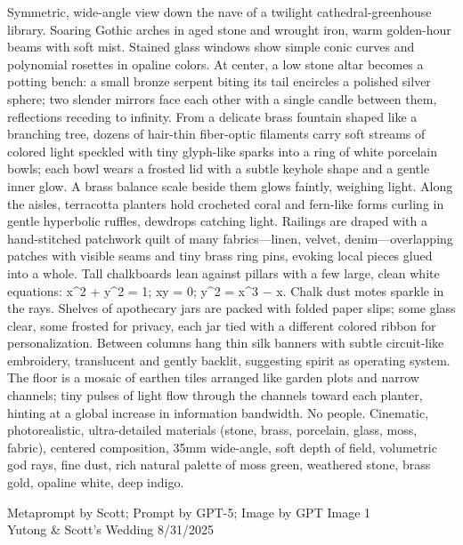 \documentclass[12pt]{article}
\begin{document}
\noindent
\begin{adjustbox}{max size={\textwidth}{\textheight}}
\begin{varwidth}{\textwidth}
\RaggedRight
\footnotesize
Symmetric, wide-angle view down the nave of a twilight cathedral-greenhouse library. Soaring Gothic arches in aged stone and wrought iron, warm golden-hour beams with soft mist. Stained glass windows show simple conic curves and polynomial rosettes in opaline colors. At center, a low stone altar becomes a potting bench: a small bronze serpent biting its tail encircles a polished silver sphere; two slender mirrors face each other with a single candle between them, reflections receding to infinity. From a delicate brass fountain shaped like a branching tree, dozens of hair-thin fiber-optic filaments carry soft streams of colored light speckled with tiny glyph-like sparks into a ring of white porcelain bowls; each bowl wears a frosted lid with a subtle keyhole shape and a gentle inner glow. A brass balance scale beside them glows faintly, weighing light. Along the aisles, terracotta planters hold crocheted coral and fern-like forms curling in gentle hyperbolic ruffles, dewdrops catching light. Railings are draped with a hand-stitched patchwork quilt of many fabrics—linen, velvet, denim—overlapping patches with visible seams and tiny brass ring pins, evoking local pieces glued into a whole. Tall chalkboards lean against pillars with a few large, clean white equations: x\textasciicircum{}2 + y\textasciicircum{}2 = 1; xy = 0; y\textasciicircum{}2 = x\textasciicircum{}3 − x. Chalk dust motes sparkle in the rays. Shelves of apothecary jars are packed with folded paper slips; some glass clear, some frosted for privacy, each jar tied with a different colored ribbon for personalization. Between columns hang thin silk banners with subtle circuit-like embroidery, translucent and gently backlit, suggesting spirit as operating system. The floor is a mosaic of earthen tiles arranged like garden plots and narrow channels; tiny pulses of light flow through the channels toward each planter, hinting at a global increase in information bandwidth. No people. Cinematic, photorealistic, ultra-detailed materials (stone, brass, porcelain, glass, moss, fabric), centered composition, 35mm wide-angle, soft depth of field, volumetric god rays, fine dust, rich natural palette of moss green, weathered stone, brass gold, opaline white, deep indigo.
\end{varwidth}
\end{adjustbox}
\vfill
{\raggedleft\footnotesize
Metaprompt by Scott; Prompt by GPT-5; Image by GPT Image 1 \\
Yutong \& Scott's Wedding 8/31/2025\par}
\end{document}
